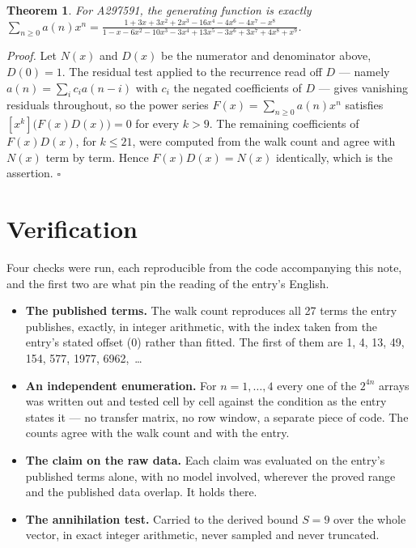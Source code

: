 \documentclass[11pt]{article}
\newtheorem{theorem}{Theorem}
\theoremstyle{definition}
\begin{document}
\begin{theorem} For A297591, the generating function is exactly $\sum_{n\ge 0} a(n)x^n = \frac{1 + 3x + 3x^{2} + 2x^{3} - 16x^{4} - 4x^{6} - 4x^{7} - x^{8}}{1 - x - 6x^{2} - 10x^{3} - 3x^{4} + 13x^{5} - 3x^{6} + 3x^{7} + 4x^{8} + x^{9}}$.\end{theorem}

{\itshape Proof.} Let $N(x)$ and $D(x)$ be the numerator and denominator above, $D(0)=1$. The residual test applied to the recurrence read off $D$ --- namely $a(n) = \sum_i c_i a(n-i)$ with $c_i$ the negated coefficients of $D$ --- gives vanishing residuals throughout, so the power series $F(x)=\sum_{n\ge 0}a(n)x^n$ satisfies $[x^k]\bigl(F(x)D(x)\bigr) = 0$ for every $k > 9$. The remaining coefficients of $F(x)D(x)$, for $k \le 21$, were computed from the walk count and agree with $N(x)$ term by term. Hence $F(x)D(x) = N(x)$ identically, which is the assertion. $\square$

\section{Verification}

Four checks were run, each reproducible from the code accompanying this note, and the first two are what pin the reading of the entry's English.

\begin{itemize}

\item {\bfseries The published terms.} The walk count reproduces all 27 terms the entry publishes, exactly, in integer arithmetic, with the index taken from the entry's stated offset (0) rather than fitted. The first of them are 1, 4, 13, 49, 154, 577, 1977, 6962,~\dots

\item {\bfseries An independent enumeration.} For $n = 1,\dots,4$ every one of the $2^{4n}$ arrays was written out and tested cell by cell against the condition as the entry states it --- no transfer matrix, no row window, a separate piece of code. The counts agree with the walk count and with the entry.

\item {\bfseries The claim on the raw data.} Each claim was evaluated on the entry's published terms alone, with no model involved, wherever the proved range and the published data overlap. It holds there.

\item {\bfseries The annihilation test.} Carried to the derived bound $S = 9$ over the whole vector, in exact integer arithmetic, never sampled and never truncated.

\end{itemize}
\end{document}
